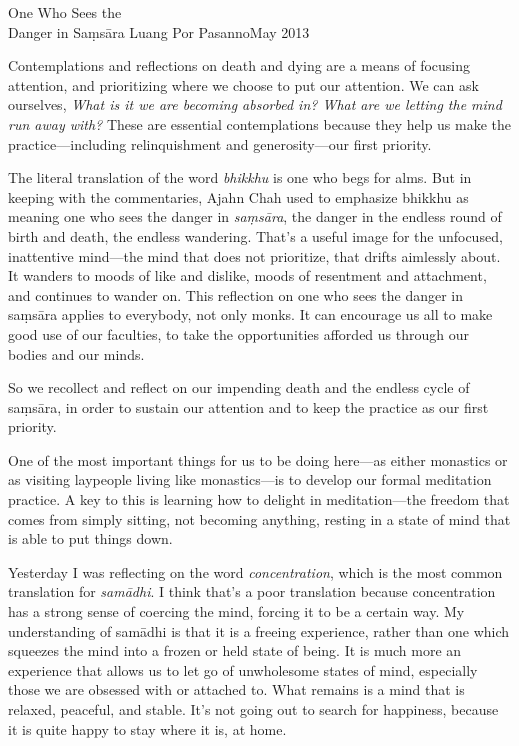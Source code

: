 {One Who Sees the\\Danger in Saṃsāra}
{Luang Por Pasanno}{May 2013}

Contemplations and reflections on death and dying are a means of 
focusing attention, and prioritizing where we choose to put our 
attention. We can ask ourselves, \emph{What is it we are becoming 
absorbed in? What are we letting the mind run away with?} These are 
essential contemplations because they help us make the 
practice---including relinquishment and generosity---our first priority.

The literal translation of the word \emph{bhikkhu} is one who begs for 
alms. But in keeping with the commentaries, Ajahn Chah used to 
emphasize bhikkhu as meaning one who sees the danger in 
\emph{saṃsāra}, the danger in the endless round of birth and death, 
the endless wandering. That's a useful image for the unfocused, 
inattentive mind---the mind that does not prioritize, that drifts 
aimlessly about. It wanders to moods of like and dislike, moods of 
resentment and attachment, and continues to wander on. This reflection 
on one who sees the danger in saṃsāra applies to everybody, not only 
monks. It can encourage us all to make good use of our faculties, to 
take the opportunities afforded us through our bodies and our minds.

So we recollect and reflect on our impending death and the endless 
cycle of saṃsāra, in order to sustain our attention and to keep the 
practice as our first priority.


One of the most important things for us to be doing here---as either 
monastics or as visiting laypeople living like monastics---is to 
develop our formal meditation practice. A key to this is learning how 
to delight in meditation---the freedom that comes from simply sitting, 
not becoming anything, resting in a state of mind that is able to put 
things down.

Yesterday I was reflecting on the word \emph{concentration}, which is 
the most common translation for \emph{samādhi}. I think that's a poor 
translation because concentration has a strong sense of coercing the 
mind, forcing it to be a certain way. My understanding of samādhi is 
that it is a freeing experience, rather than one which squeezes the 
mind into a frozen or held state of being. It is much more an 
experience that allows us to let go of unwholesome states of mind, 
especially those we are obsessed with or attached to. What remains is a 
mind that is relaxed, peaceful, and stable. It's not going out to 
search for happiness, because it is quite happy to stay where it is, at 
home.

